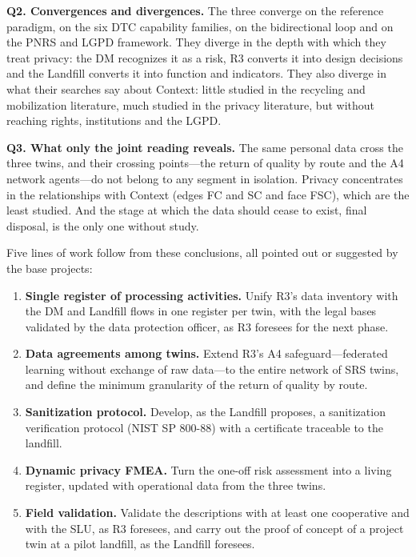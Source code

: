 \documentclass[12pt,a4paper,article,oneside,brazil,english]{abntex2}
\begin{document}
\textbf{Q2. Convergences and divergences.} The three converge on the reference paradigm, on the six DTC capability families, on the bidirectional loop and on the PNRS and LGPD framework. They diverge in the depth with which they treat privacy: the DM recognizes it as a risk, R3 converts it into design decisions and the Landfill converts it into function and indicators. They also diverge in what their searches say about Context: little studied in the recycling and mobilization literature, much studied in the privacy literature, but without reaching rights, institutions and the LGPD.

\textbf{Q3. What only the joint reading reveals.} The same personal data cross the three twins, and their crossing points---the return of quality by route and the A4 network agents---do not belong to any segment in isolation. Privacy concentrates in the relationships with Context (edges FC and SC and face FSC), which are the least studied. And the stage at which the data should cease to exist, final disposal, is the only one without study.

Five lines of work follow from these conclusions, all pointed out or suggested by the base projects:

\begin{enumerate}
\item \textbf{Single register of processing activities.} Unify R3's data inventory with the DM and Landfill flows in one register per twin, with the legal bases validated by the data protection officer, as R3 foresees for the next phase.
\item \textbf{Data agreements among twins.} Extend R3's A4 safeguard---federated learning without exchange of raw data---to the entire network of SRS twins, and define the minimum granularity of the return of quality by route.
\item \textbf{Sanitization protocol.} Develop, as the Landfill proposes, a sanitization verification protocol (NIST SP 800-88) with a certificate traceable to the landfill.
\item \textbf{Dynamic privacy FMEA.} Turn the one-off risk assessment into a living register, updated with operational data from the three twins.
\item \textbf{Field validation.} Validate the descriptions with at least one cooperative and with the SLU, as R3 foresees, and carry out the proof of concept of a project twin at a pilot landfill, as the Landfill foresees.
\end{enumerate}
\end{document}
